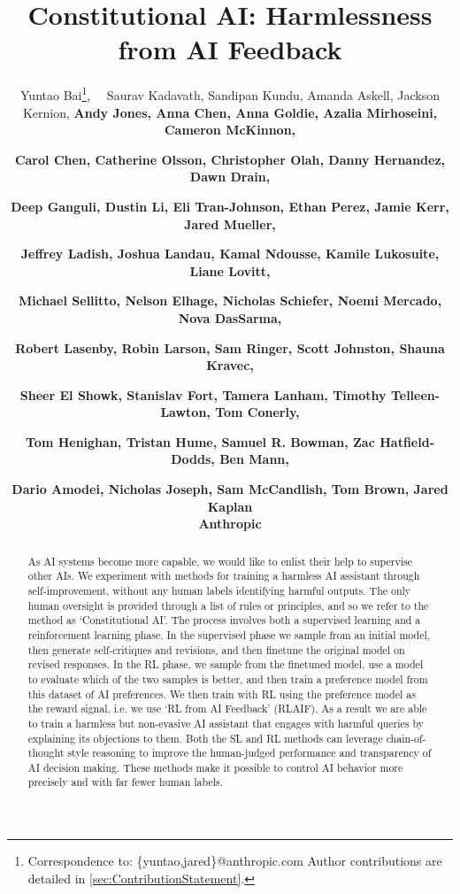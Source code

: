 \documentclass[english]{article}
\renewcommand\>{\rangle}
\newcommand*\samethanks[1][\value{footnote}]{\footnotemark[#1]}
\begin{document}
\title{Constitutional AI:  Harmlessness from AI Feedback}

 
\author{
Yuntao Bai\thanks{Correspondence to: \{yuntao,jared\}@anthropic.com \newline Author contributions are detailed in  \ref{sec:ContributionStatement}. },~~ Saurav Kadavath, Sandipan Kundu, Amanda Askell, Jackson Kernion,  \And \bf
Andy Jones,
Anna Chen,
Anna Goldie,
Azalia Mirhoseini,
Cameron McKinnon, \and\bf 
Carol Chen, 
Catherine Olsson,  
Christopher Olah,
Danny Hernandez, 
Dawn Drain, \and\bf
Deep Ganguli, 
Dustin Li,
Eli Tran-Johnson,
Ethan Perez,
Jamie Kerr,
Jared Mueller, \and\bf
Jeffrey Ladish,
Joshua Landau,
 Kamal Ndousse,
Kamile Lukosuite,
Liane Lovitt,\and\bf
Michael Sellitto,  
Nelson Elhage,
Nicholas Schiefer,  
Noemi Mercado,
Nova DasSarma,\and\bf
Robert Lasenby, 
Robin Larson,
Sam Ringer,  
Scott Johnston, 
Shauna Kravec,\and\bf
Sheer El Showk,
Stanislav Fort,
Tamera Lanham,
Timothy Telleen-Lawton,
Tom Conerly, \and\bf 
Tom Henighan,
Tristan Hume,
Samuel R. Bowman,
Zac Hatfield-Dodds, 
Ben Mann, \and\bf 
Dario Amodei, 
Nicholas Joseph, Sam McCandlish, Tom Brown, 
Jared Kaplan\samethanks 
\AND \\
{\Large Anthropic}}

\maketitle


\begin{abstract}

As AI systems become more capable, we would like to enlist their help to supervise other AIs.
We experiment with methods for training a harmless AI assistant through self-improvement, without any human labels identifying harmful outputs.  The only human oversight is provided through a list of rules or principles, and so we refer to the method as `Constitutional AI'.  The process involves both a supervised learning and a reinforcement learning phase. In the supervised phase we sample from an initial model, then generate self-critiques and revisions, and then finetune the original model on revised responses. In the RL phase, we sample from the finetuned model, use a model to evaluate which of the two samples is better, and then train a preference model from this dataset of AI preferences.  We then train with RL using the preference model as the reward signal, i.e. we use `RL from AI Feedback' (RLAIF).  As a result we are able to train a harmless but non-evasive AI assistant that engages with harmful queries by explaining its objections to them.  Both the SL and RL methods can leverage chain-of-thought style reasoning to improve the human-judged performance and transparency of AI decision making.  These methods make it possible to control AI behavior more precisely and with far fewer human labels.


\end{abstract}
\end{document}
